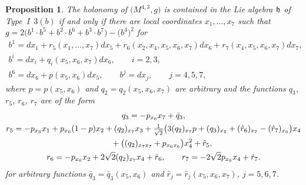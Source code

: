 \documentclass[pdftex]{sigma}
\numberwithin{equation}{section}
\newtheorem{Proposition}[Theorem]{Proposition}
 { \theoremstyle{definition}
\newtheorem{Definition}[Theorem]{Definition}
\newtheorem{Example}[Theorem]{Example}
\newtheorem{Remark}[Theorem]{Remark} }
\newcommand\fh{{\frak h}}
\begin{document}
\begin{Proposition} The holonomy of $\big(M^{4,3},g\big)$ is contained in the Lie algebra $\fh$ of Type~I~$3(b)$ if and only if there are local coordinates $x_1,\dots,x_7$ such that $g=2\big(b^1\cdot b^5+b^2\cdot b^6+b^3\cdot b^7\big)- \big(b^4\big)^2$ for
\begin{gather*}
b^1= dx_1 + r_5(x_1,\dots, x_7)dx_5+r_6(x_2,x_4,x_5, x_6,x_7)dx_6+r_7(x_4,x_5,x_6,x_7)dx_7, \\
b^i= dx_i+q_i(x_5,x_6,x_7)dx_6,\qquad i=2,3, \\
b^6= dx_6 + p(x_5,x_6) dx_5 ,\qquad
b^j= dx_j,\qquad j=4,5,7,
\end{gather*}
where
$p=p(x_5,x_6)$ and $q_2=q_2(x_5,x_6,x_7)$ are arbitrary and the functions $q_3$, $r_5$, $r_6$, $r_7$ are of the form
\begin{gather*}
q_3 = -p_{x_6}x_7+\bar q_3,\\
r_5 = -p_{x_6} x_1 +p_{x_6}(1-p)x_2 +(q_2)_{x_7}x_3+\tfrac1{\sqrt2}\big(3(q_2)_{x_7}p+(q_3)_{x_5}+(\hat r_6)_{x_7}-(\hat r_7)_{x_6}\big)x_4 \\
\hphantom{r_5 =}{} +\big((q_2)_{x_7 x_7}+p_{x_6 x_6}\big)x_4^2 +\hat r_5, \\
r_6 = -p_{x_6}x_2 +2\sqrt2 (q_2)_{x_7} x_4+\hat r_6,\qquad
r_7 = -2\sqrt2 p_{x_6}x_4 +\hat r_7.
\end{gather*}
for arbitrary functions $\bar q_3=\bar q_3(x_5,x_6)$ and $\hat r _j =\hat r_j(x_5,x_6,x_7)$, $j=5,6,7$.
\end{Proposition}
\end{document}
